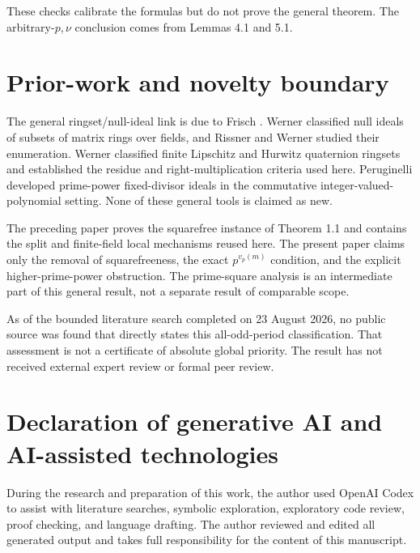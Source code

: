 \documentclass[11pt]{article}
\numberwithin{equation}{section}
\begin{document}
These checks calibrate the formulas but do not prove the general theorem.
The arbitrary-$p,\nu$ conclusion comes from Lemmas 4.1 and 5.1.

\section{Prior-work and novelty boundary}


The general ringset/null-ideal link is due to Frisch \cite{frisch2018}. Werner \cite{werner2022}
classified null ideals of subsets of matrix rings over fields, and Rissner
and Werner \cite{rissnerwerner2025} studied their enumeration. Werner \cite{werner2026} classified finite
Lipschitz and Hurwitz quaternion ringsets and established the residue and
right-multiplication criteria used here. Peruginelli \cite{peruginelli2014} developed
prime-power fixed-divisor ideals in the commutative integer-valued-polynomial
setting. None of these general tools is claimed as new.

The preceding paper \cite{carptopus2026} proves the squarefree instance of Theorem 1.1 and
contains the split and finite-field local mechanisms reused here. The present
paper claims only the removal of squarefreeness, the exact
$p^{v_p(m)}$ condition, and the explicit higher-prime-power obstruction.
The prime-square analysis is an intermediate part of this general result,
not a separate result of comparable scope.

As of the bounded literature search completed on 23 August 2026, no public
source was found that directly states this all-odd-period classification.
That assessment is not a certificate of absolute global priority. The result
has not received external expert review or formal peer review.

\section*{Declaration of generative AI and AI-assisted technologies}


During the research and preparation of this work, the author used OpenAI
Codex to assist with literature searches, symbolic exploration, exploratory
code review, proof checking, and language drafting. The author reviewed and
edited all generated output and takes full responsibility for the content of
this manuscript.
\end{document}

